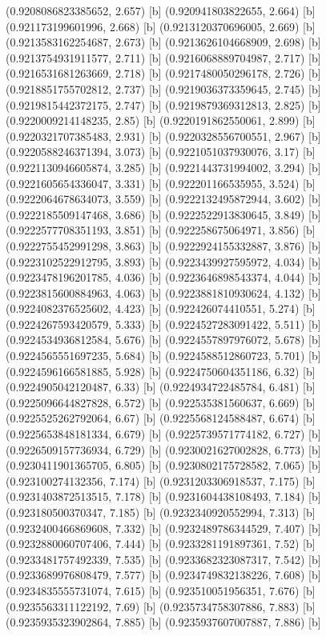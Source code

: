 {{{(0.9208086823385652, 2.657) [b] 
(0.920941803822655, 2.664) [b] 
(0.921173199601996, 2.668) [b] 
(0.9213120370696005, 2.669) [b] 
(0.9213583162254687, 2.673) [b] 
(0.9213626104668909, 2.698) [b] 
(0.9213754931911577, 2.711) [b] 
(0.9216068889704987, 2.717) [b] 
(0.9216531681263669, 2.718) [b] 
(0.9217480050296178, 2.726) [b] 
(0.9218851755702812, 2.737) [b] 
(0.9219036373359645, 2.745) [b] 
(0.9219815442372175, 2.747) [b] 
(0.9219879369312813, 2.825) [b] 
(0.9220009214148235, 2.85) [b] 
(0.9220191862550061, 2.899) [b] 
(0.9220321707385483, 2.931) [b] 
(0.9220328556700551, 2.967) [b] 
(0.9220588246371394, 3.073) [b] 
(0.9221051037930076, 3.17) [b] 
(0.9221130946605874, 3.285) [b] 
(0.9221443731994002, 3.294) [b] 
(0.9221605654336047, 3.331) [b] 
(0.922201166535955, 3.524) [b] 
(0.9222064678634073, 3.559) [b] 
(0.9222132495872944, 3.602) [b] 
(0.9222185509147468, 3.686) [b] 
(0.9222522913830645, 3.849) [b] 
(0.9222577708351193, 3.851) [b] 
(0.922258675064971, 3.856) [b] 
(0.9222755452991298, 3.863) [b] 
(0.9222924155332887, 3.876) [b] 
(0.9223102522912795, 3.893) [b] 
(0.9223439927595972, 4.034) [b] 
(0.9223478196201785, 4.036) [b] 
(0.9223646898543374, 4.044) [b] 
(0.9223815600884963, 4.063) [b] 
(0.9223881810930624, 4.132) [b] 
(0.9224082376525602, 4.423) [b] 
(0.922426074410551, 5.274) [b] 
(0.9224267593420579, 5.333) [b] 
(0.9224527283091422, 5.511) [b] 
(0.9224534936812584, 5.676) [b] 
(0.9224557897976072, 5.678) [b] 
(0.9224565551697235, 5.684) [b] 
(0.9224588512860723, 5.701) [b] 
(0.9224596166581885, 5.928) [b] 
(0.9224750604351186, 6.32) [b] 
(0.9224905042120487, 6.33) [b] 
(0.9224934722485784, 6.481) [b] 
(0.9225096644827828, 6.572) [b] 
(0.922535381560637, 6.669) [b] 
(0.9225525262792064, 6.67) [b] 
(0.9225568124588487, 6.674) [b] 
(0.9225653848181334, 6.679) [b] 
(0.9225739571774182, 6.727) [b] 
(0.9226509157736934, 6.729) [b] 
(0.9230021627002828, 6.773) [b] 
(0.9230411901365705, 6.805) [b] 
(0.9230802175728582, 7.065) [b] 
(0.923100274132356, 7.174) [b] 
(0.9231203306918537, 7.175) [b] 
(0.9231403872513515, 7.178) [b] 
(0.9231604438108493, 7.184) [b] 
(0.923180500370347, 7.185) [b] 
(0.9232340920552994, 7.313) [b] 
(0.9232400466869608, 7.332) [b] 
(0.9232489786344529, 7.407) [b] 
(0.9232880060707406, 7.444) [b] 
(0.9233281191897361, 7.52) [b] 
(0.9233481757492339, 7.535) [b] 
(0.9233682323087317, 7.542) [b] 
(0.9233689976808479, 7.577) [b] 
(0.9234749832138226, 7.608) [b] 
(0.9234835555731074, 7.615) [b] 
(0.923510051956351, 7.676) [b] 
(0.9235563311122192, 7.69) [b] 
(0.9235734758307886, 7.883) [b] 
(0.9235935323902864, 7.885) [b] 
(0.9235937607007887, 7.886) [b] 
}}}
